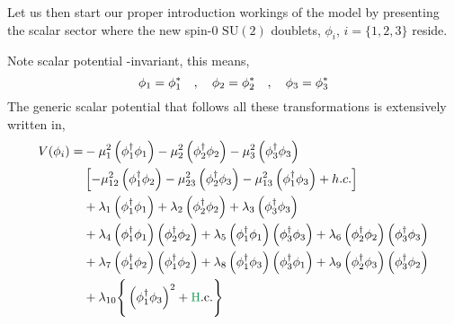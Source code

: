 Let us then start our proper introduction  workings of the model by presenting the scalar sector where the new spin-0 $\mathrm{SU(2)}$ doublets, $\phi_i$, $i=\{1,2,3\}$ reside. 
\begin{comment}
The scalar doublets are made to transform under the imposed $\mathrm{U(1)}\times \mathbb{Z}_2$ symmetries as, 
%
\begin{equation}
\begin{split}
\mathrm{U(1)} & : \phi_1 \rightarrow \phi_1 e^{i \alpha} \quad ,
            \quad \phi_3 \rightarrow \phi_3 e^{i \alpha}  \\
\mathbb{Z}_2  & : \phi_1 \rightarrow -\phi_1 \ \ \quad , 
            \quad \phi_2 \rightarrow \phi_2  \quad , 
            \quad \phi_3 \rightarrow \phi_3 \quad .
\end{split}
\end{equation}
\end{comment}
Note  scalar potential  -invariant, this means,
\begin{equation}
\phi_1 = \phi_1^{\**} \quad , \quad \phi_2 = \phi_2^{\**} \quad , \quad 
\phi_3 = \phi_3^{\**} 
\end{equation}
The generic scalar potential that follows all these transformations is extensively written in, 
\begin{equation}
\label{eq:3HDM_Scalar_Pot}
\begin{split}
V(\phi_i) = & 
- \mu_1^2 \left( \phi^{\dagger}_1 \phi_1 \right) 
- \mu_2^2 \left( \phi^{\dagger}_2 \phi_2 \right)  
- \mu_3^2 \left( \phi^{\dagger}_3 \phi_3 \right) \\ 
& \left[ - \mu_{12}^2 \left( \phi^{\dagger}_1 \phi_2  \right) 
  - \mu_{23}^2 \left( \phi^{\dagger}_2 \phi_3  \right)  
  - \mu_{13}^2 \left( \phi^{\dagger}_1 \phi_3  \right) + h.c. \right]  \\
& + \lambda_1 \left( \phi^{\dagger}_1 \phi_1 \right) 
  + \lambda_2 \left( \phi^{\dagger}_2 \phi_2 \right)  
  + \lambda_3 \left( \phi^{\dagger}_3 \phi_3 \right) \\  
& + \lambda_4 \left( \phi^{\dagger}_1 \phi_1 \right)  \left( \phi^{\dagger}_2 \phi_2 \right) 
  + \lambda_5 \left( \phi^{\dagger}_1 \phi_1 \right)  \left( \phi^{\dagger}_3 \phi_3 \right)  
  + \lambda_6 \left( \phi^{\dagger}_2 \phi_2 \right)  \left( \phi^{\dagger}_3 \phi_3 \right)  \\ 
& + \lambda_7 \left( \phi^{\dagger}_1 \phi_2 \right)  \left( \phi^{\dagger}_1 \phi_2 \right)  
  + \lambda_8 \left( \phi^{\dagger}_1 \phi_3 \right)  \left( \phi^{\dagger}_3 \phi_1 \right)   
  + \lambda_9 \left( \phi^{\dagger}_2 \phi_3 \right)  \left( \phi^{\dagger}_3 \phi_2 \right)  \\
& + \lambda_{10} \Bigg\{ \left( \phi^{\dagger}_1 \phi_3 \right)^2 + \text{\Joaoadd{H}.c.} \Bigg\}   
\end{split} 
\end{equation}
